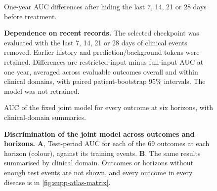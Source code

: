 \begin{figure}[p]
    {One-year AUC differences after hiding the last 7, 14, 21 or 28 days before treatment.}
  \caption{\textbf{Dependence on recent records.} The selected checkpoint was
  evaluated with the last 7, 14, 21 or 28 days of clinical events removed.
  Earlier history and prediction/background tokens were retained. Differences
  are restricted-input minus full-input AUC at one year, averaged across
  evaluable outcomes overall and within clinical domains, with paired
  patient-bootstrap 95\% intervals. The model was not retrained.}
  \label{fig:recent-record-gaps}
\end{figure}

\begin{figure}[p]
    {AUC of the fixed joint model for every outcome at six horizons,
    with clinical-domain summaries.}
  \caption{\textbf{Discrimination of the joint model across outcomes and
  horizons.} \textbf{A}, Test-period AUC for each of the 69
  outcomes at each horizon (colour), against its training events.
  \textbf{B}, The same results summarised by clinical domain. Outcomes or
  horizons without enough test events are not shown, and every outcome in every disease is in \cref{fig:supp-atlas-matrix}.}
  \label{fig:atlas}
\end{figure}

